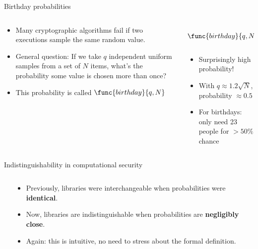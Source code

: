 \documentclass[aspectratio=169, lualatex, handout]{beamer}
\begin{document}
\begin{frame}{Birthday probabilities}
	\begin{columns}[c]
		\begin{column}{0.6\textwidth}
			\begin{itemize}[<+->]
				\item Many cryptographic algorithms fail if two executions sample the same random value.
				\item General question: If we take $q$ independent uniform samples from a set of $N$ items, what's the probability some value is chosen more than once?
				\item This probability is called $\func{birthday}{q,N}$
			\end{itemize}
		\end{column}
		\begin{column}{0.4\textwidth}
			\begin{align*}
				\func{birthday}{q,N} = 1 - \prod_{i=1}^{q-1} \left(1 - \frac{i}{N}\right)
			\end{align*}
			\begin{itemize}[<+->]
				\item Surprisingly high probability!
				\item With $q \approx 1.2\sqrt{N}$, probability $\approx 0.5$
				\item For birthdays: only need 23 people for $>50\%$ chance
			\end{itemize}
		\end{column}
	\end{columns}
\end{frame}

\begin{frame}{Indistinguishability in computational security}
	\begin{columns}[c]
		\begin{column}{0.6\textwidth}
		\end{column}
		\begin{column}{0.4\textwidth}
			\begin{itemize}[<+->]
				\item Previously, libraries were interchangeable when probabilities were \textbf{identical}.
				\item Now, libraries are indistinguishable when probabilities are \textbf{negligibly close}.
				\item Again: this is intuitive, no need to stress about the formal definition.
			\end{itemize}
		\end{column}
	\end{columns}
\end{frame}
\end{document}
